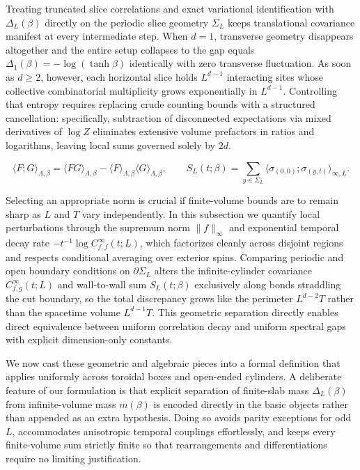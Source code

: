 \documentclass[11pt]{article}
\theoremstyle{definition}
\begin{document}
Treating truncated slice correlations and exact variational identification with
$\Delta_L(\beta)$ directly on the periodic slice geometry $\Sigma_L$ keeps
translational covariance manifest at every intermediate step. When $d = 1$,
transverse geometry disappears altogether and the entire setup collapses to the gap
equals $\Delta_1(\beta) = -\log(\tanh \beta)$ identically with zero transverse
fluctuation. As soon as $d \ge 2$, however, each horizontal slice holds $L^{d-1}$
interacting sites whose collective combinatorial multiplicity grows exponentially in
$L^{d-1}$. Controlling that entropy requires replacing crude counting bounds with a
structured cancellation: specifically, subtraction of disconnected expectations via
mixed derivatives of $\log Z$ eliminates extensive volume prefactors in ratios and
logarithms, leaving local sums governed solely by $2d$.

\[
  \langle F ; G \rangle_{\Lambda,\beta} = \langle F G \rangle_{\Lambda,\beta} - \langle F \rangle_{\Lambda,\beta} \langle G \rangle_{\Lambda,\beta}, \qquad S_L(t; \beta) = \sum_{y \in \Sigma_L} \langle \sigma_{(0,0)} ; \sigma_{(y,t)} \rangle_{\infty, L}.
\]

Selecting an appropriate norm is crucial if finite-volume bounds are to remain sharp
as $L$ and $T$ vary independently. In this subsection we quantify local
perturbations through the supremum norm $\|f\|_\infty$ and exponential temporal
decay rate $-t^{-1} \log C_{f,f}^\infty(t; L)$, which factorizes cleanly across
disjoint regions and respects conditional averaging over exterior spins. Comparing
periodic and open boundary conditions on $\partial \Sigma_L$ alters the
infinite-cylinder covariance $C_{f,g}^\infty(t; L)$ and wall-to-wall sum $S_L(t;
\beta)$ exclusively along bonds straddling the cut boundary, so the total
discrepancy grows like the perimeter $L^{d-2} T$ rather than the spacetime volume
$L^{d-1} T$. This geometric separation directly enables direct equivalence between
uniform correlation decay and uniform spectral gaps with explicit dimension-only
constants.

We now cast these geometric and algebraic pieces into a formal definition that
applies uniformly across toroidal boxes and open-ended cylinders. A deliberate
feature of our formulation is that explicit separation of finite-slab mass
$\Delta_L(\beta)$ from infinite-volume mass $m(\beta)$ is encoded directly in the
basic objects rather than appended as an extra hypothesis. Doing so avoids parity
exceptions for odd $L$, accommodates anisotropic temporal couplings effortlessly,
and keeps every finite-volume sum strictly finite so that rearrangements and
differentiations require no limiting justification.
\end{document}

